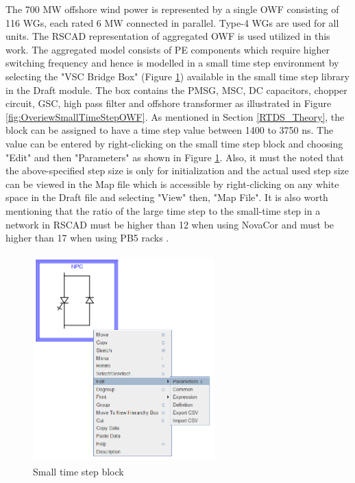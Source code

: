 The 700 MW offshore wind power is represented by a single \gls{OWF} consisting of 116 \gls{WG}s, each rated 6 MW connected in parallel. Type-4 \gls{WG}s are used for all units. The RSCAD representation of aggregated \gls{OWF} is used utilized in this work. The aggregated model consists of \gls{PE} components which require higher switching frequency %
and hence is modelled in a small time step environment by selecting the "VSC Bridge Box" (Figure \ref{fig:SmallTimeStepBlock}) available in the small time step library in the Draft module. The box contains the \gls{PMSG}, \gls{MSC}, \gls{DC} capacitors, chopper circuit, \gls{GSC}, high pass filter and offshore transformer as illustrated in Figure \ref{fig:OveriewSmallTimeStepOWF}. As mentioned in Section \ref{RTDS_Theory}, the block can be assigned to have a time step value between 1400 to 3750 ns. 
The value can be entered by right-clicking on the small time step block and choosing "Edit" and then "Parameters" as shown in Figure \ref{fig:SmallTimeStepBlock}. Also, it must the noted that the above-specified step size is only for initialization and the actual used step size can be viewed in the Map file which is accessible by right-clicking on any white space in the Draft file and selecting "View" then, "Map File". It is also worth mentioning that the ratio of the large time step to the small-time step in a network in RSCAD must be higher than 12 when using NovaCor and must be higher than 17 when using PB5 racks \cite{rtds_tech}. 

\begin{figure}[H]
\centering
    \includegraphics[height = 8cm,width = 7cm]{Diagrams/Chapter_3/SmallTimeStepBlock.PNG}
    \caption{Small time step block}
    \label{fig:SmallTimeStepBlock}
\end{figure}

